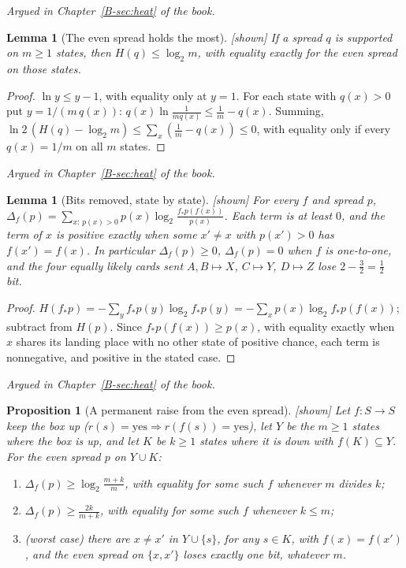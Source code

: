 \documentclass[11pt, a4paper]{article}
\theoremstyle{plain}
\newtheorem{proposition}[theorem]{Proposition}
\newtheorem{lemma}[theorem]{Lemma}
\theoremstyle{definition}
\theoremstyle{remark}
\newcommand{\rd}{r}
\newcommand{\argued}[1]{\par\noindent\textit{Argued in Chapter~\ref{B-#1} of the book.}\par}
\newcommand{\kind}[1]{\textup{[#1]}}
\begin{document}
\argued{sec:heat}

\begin{lemma}[The even spread holds the most]\label{spec:log-line} \kind{shown}
If a spread $q$ is supported on $m\ge1$ states, then $H(q)\le\log_2 m$, with equality exactly for the even
spread on those states.
\end{lemma}

\begin{proof}
$\ln y\le y-1$, with equality only at $y=1$. For each state with $q(x)>0$ put $y=1/(m\,q(x))$:
$q(x)\ln\frac{1}{m q(x)}\le\frac1m-q(x)$. Summing, $\ln 2\,(H(q)-\log_2 m)\le\sum_x(\frac1m-q(x))\le0$,
with equality only if every $q(x)=1/m$ on all $m$ states.
\end{proof}

\argued{sec:heat}

\begin{lemma}[Bits removed, state by state]\label{spec:per-state} \kind{shown}
For every $f$ and spread $p$,
$\Delta_f(p)=\sum_{x:\,p(x)>0}p(x)\log_2\frac{f_*p(f(x))}{p(x)}$. Each term is at least $0$, and the term
of $x$ is positive exactly when some $x'\ne x$ with $p(x')>0$ has $f(x')=f(x)$. In particular
$\Delta_f(p)\ge0$, $\Delta_f(p)=0$ when $f$ is one-to-one, and the four equally likely cards sent
$A,B\mapsto X$, $C\mapsto Y$, $D\mapsto Z$ lose $2-\frac32=\frac12$ bit.
\end{lemma}

\begin{proof}
$H(f_*p)=-\sum_y f_*p(y)\log_2 f_*p(y)=-\sum_x p(x)\log_2 f_*p(f(x))$; subtract from $H(p)$. Since
$f_*p(f(x))\ge p(x)$, with equality exactly when $x$ shares its landing place with no other state of
positive chance, each term is nonnegative, and positive in the stated case.
\end{proof}

\argued{sec:heat}

\begin{proposition}[A permanent raise from the even spread]\label{spec:raise-bits} \kind{shown}
Let $f:S\to S$ keep the box up ($\rd(s)=\mathrm{yes}\Rightarrow\rd(f(s))=\mathrm{yes}$), let $Y$ be the
$m\ge1$ states where the box is up, and let $K$ be $k\ge1$ states where it is down with $f(K)\subseteq Y$.
For the even spread $p$ on $Y\cup K$:
\begin{enumerate}[label=(\alph*)]
\item $\Delta_f(p)\ge\log_2\frac{m+k}{m}$, with equality for some such $f$ whenever $m$ divides $k$;
\item $\Delta_f(p)\ge\frac{2k}{m+k}$, with equality for some such $f$ whenever $k\le m$;
\item (worst case) there are $x\ne x'$ in $Y\cup\{s\}$, for any $s\in K$, with $f(x)=f(x')$, and the even
spread on $\{x,x'\}$ loses exactly one bit, whatever $m$.
\end{enumerate}
\end{proposition}
\end{document}
